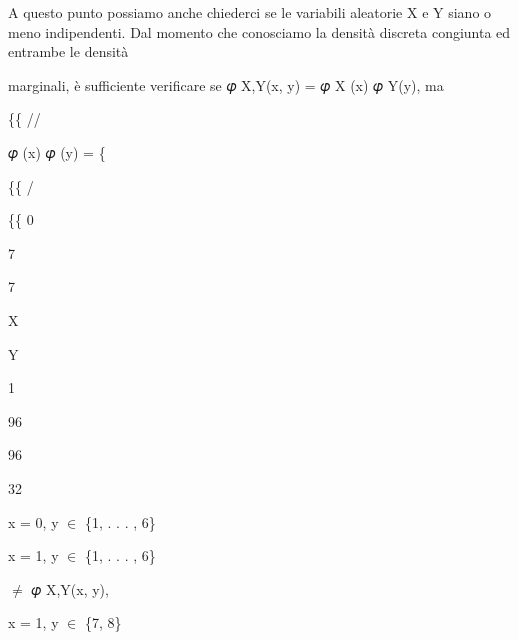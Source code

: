 \documentclass[a4paper,portrait,12pt]{article}
\begin{document}
\begin{flushleft}
A questo punto possiamo anche chiederci se le variabili aleatorie X e Y siano o meno indipendenti. Dal momento che conosciamo la densit\`{a} discreta congiunta ed entrambe le densit\`{a}
\end{flushleft}


\begin{flushleft}
marginali, \`{e} sufficiente verificare se 𝜑 X,Y(x, y) = 𝜑 X (x) 𝜑 Y(y), ma
\end{flushleft}





\{\{ //


\begin{flushleft}
𝜑 (x) 𝜑 (y) = \{
\end{flushleft}


\{\{ /


\{\{ 0


7


7





\begin{flushleft}
X
\end{flushleft}





\begin{flushleft}
Y
\end{flushleft}





1





96


96


32





\begin{flushleft}
x = 0, y $\in$ \{1, . . . , 6\}
\end{flushleft}


\begin{flushleft}
x = 1, y $\in$ \{1, . . . , 6\}
\end{flushleft}


\begin{flushleft}
$\neq$ 𝜑 X,Y(x, y),
\end{flushleft}


\begin{flushleft}
x = 1, y $\in$ \{7, 8\}
\end{flushleft}
\end{document}
